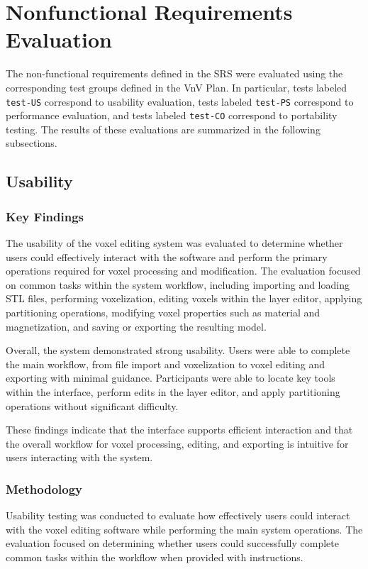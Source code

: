 \documentclass[12pt, titlepage]{article}
\begin{document}
\section{Nonfunctional Requirements Evaluation}

The non-functional requirements defined in the SRS were evaluated using the corresponding test groups defined in the VnV Plan. 
In particular, tests labeled \texttt{test-US} correspond to usability evaluation, tests labeled \texttt{test-PS} correspond to performance evaluation, and tests labeled \texttt{test-CO} correspond to portability testing. 
The results of these evaluations are summarized in the following subsections.

\subsection{Usability}
	\subsubsection{Key Findings}

The usability of the voxel editing system was evaluated to determine whether users could effectively interact with the software and perform the primary operations required for voxel processing and modification. The evaluation focused on common tasks within the system workflow, including importing and loading STL files, performing voxelization, editing voxels within the layer editor, applying partitioning operations, modifying voxel properties such as material and magnetization, and saving or exporting the resulting model.

Overall, the system demonstrated strong usability. Users were able to complete the main workflow, from file import and voxelization to voxel editing and exporting with minimal guidance. Participants were able to locate key tools within the interface, perform edits in the layer editor, and apply partitioning operations without significant difficulty.

These findings indicate that the interface supports efficient interaction and that the overall workflow for voxel processing, editing, and exporting is intuitive for users interacting with the system.	

  \subsubsection{Methodology}

Usability testing was conducted to evaluate how effectively users could interact with the voxel editing software while performing the main system operations. The evaluation focused on determining whether users could successfully complete common tasks within the workflow when provided with instructions.
\end{document}
